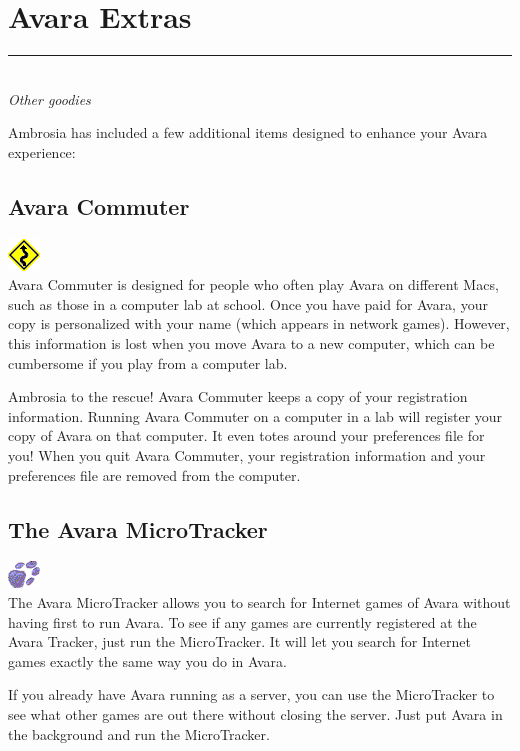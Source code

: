 \documentclass{article}
\let\oldsection\section
\renewcommand\section{\clearpage\oldsection}
\begin{document}
\section{Avara Extras}
\rule{5.5cm}{.15pt}\\
\rmfamily\textit{Other goodies}

Ambrosia has included a few additional items designed to enhance your Avara experience:

\subsection{Avara Commuter}
\includegraphics{img/27.png}\\ [0.25em]
Avara Commuter is designed for people who often play Avara on different Macs, such as those in a computer lab at school. Once you have paid for Avara, your copy is personalized with your name (which appears in network games). However, this information is lost when you move Avara to a new computer, which can be cumbersome if you play from a computer lab.

Ambrosia to the rescue! Avara Commuter keeps a copy of your registration information. Running Avara Commuter on a computer in a lab will register your copy of Avara on that computer. It even totes around your preferences file for you! When you quit Avara Commuter, your registration information and your preferences file are removed from the computer.

\subsection{The Avara MicroTracker}
\includegraphics{img/28.png}\\ [0.25em]
The Avara MicroTracker allows you to search for Internet games of Avara without having first to run Avara. To see if any games are currently registered at the Avara Tracker, just run the MicroTracker. It will let you search for Internet games exactly the same way you do in Avara.

If you already have Avara running as a server, you can use the MicroTracker to see what other games are out there without closing the server. Just put Avara in the background and run the MicroTracker.
\end{document}
